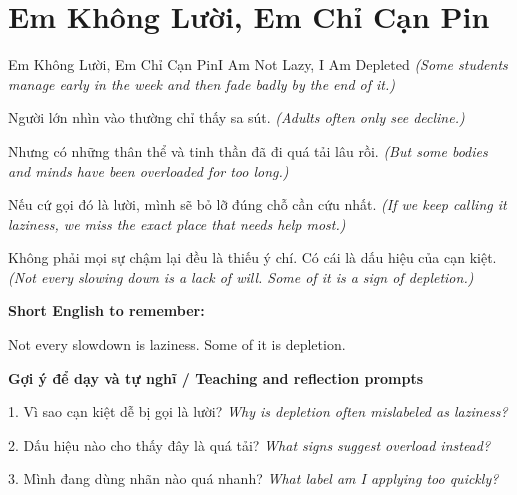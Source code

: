\section{Em Không Lười, Em Chỉ Cạn Pin}
\begin{truyen}{Em Không Lười, Em Chỉ Cạn Pin}{I Am Not Lazy, I Am Depleted}
\textit{(Some students manage early in the week and then fade badly by the end of it.)}

Người lớn nhìn vào thường chỉ thấy sa sút.
\textit{(Adults often only see decline.)}

Nhưng có những thân thể và tinh thần đã đi quá tải lâu rồi.
\textit{(But some bodies and minds have been overloaded for too long.)}

Nếu cứ gọi đó là lười, mình sẽ bỏ lỡ đúng chỗ cần cứu nhất.
\textit{(If we keep calling it laziness, we miss the exact place that needs help most.)}

\end{truyen}

\begin{baihoc}
Không phải mọi sự chậm lại đều là thiếu ý chí. Có cái là dấu hiệu của cạn kiệt.
\textit{(Not every slowing down is a lack of will. Some of it is a sign of depletion.)}
\end{baihoc}

\begin{ghinhoanh}
\textbf{Short English to remember:}

Not every slowdown is laziness. Some of it is depletion.

\end{ghinhoanh}

\begin{tuhocnhanh}
\textbf{Gợi ý để dạy và tự nghĩ / Teaching and reflection prompts}

1. Vì sao cạn kiệt dễ bị gọi là lười? \textit{Why is depletion often mislabeled as laziness?}

2. Dấu hiệu nào cho thấy đây là quá tải? \textit{What signs suggest overload instead?}

3. Mình đang dùng nhãn nào quá nhanh? \textit{What label am I applying too quickly?}
\end{tuhocnhanh}
\ngancach


